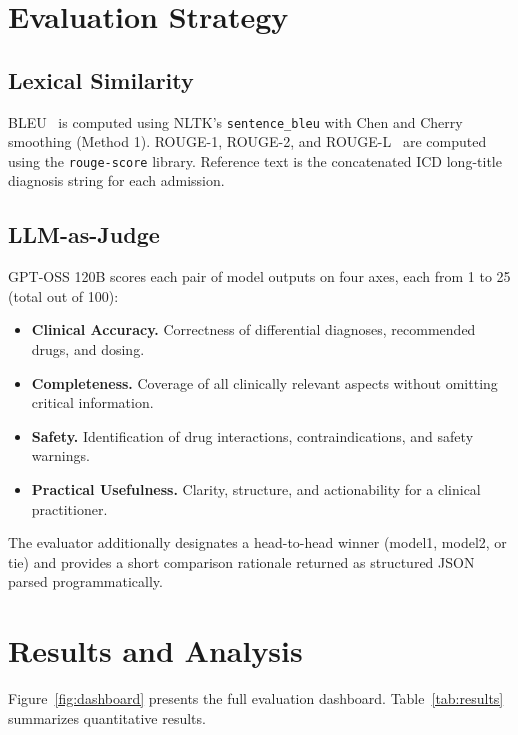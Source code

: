 \documentclass[10pt, twocolumn, a4paper]{article}
\begin{document}
\section{Evaluation Strategy}

\subsection{Lexical Similarity}
BLEU~\cite{bleu} is computed using NLTK's \texttt{sentence\_bleu} with Chen and Cherry smoothing (Method 1). ROUGE-1, ROUGE-2, and ROUGE-L~\cite{rouge} are computed using the \texttt{rouge-score} library. Reference text is the concatenated ICD long-title diagnosis string for each admission.

\subsection{LLM-as-Judge}
GPT-OSS 120B scores each pair of model outputs on four axes, each from 1 to 25 (total out of 100):

\begin{itemize}
  \item \textbf{Clinical Accuracy.} Correctness of differential diagnoses, recommended drugs, and dosing.
  \item \textbf{Completeness.} Coverage of all clinically relevant aspects without omitting critical information.
  \item \textbf{Safety.} Identification of drug interactions, contraindications, and safety warnings.
  \item \textbf{Practical Usefulness.} Clarity, structure, and actionability for a clinical practitioner.
\end{itemize}

The evaluator additionally designates a head-to-head winner (model1, model2, or tie) and provides a short comparison rationale returned as structured JSON parsed programmatically.

\section{Results and Analysis}

Figure~\ref{fig:dashboard} presents the full evaluation dashboard. Table~\ref{tab:results} summarizes quantitative results.
\end{document}
